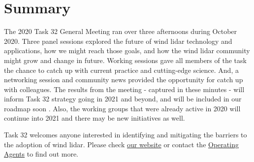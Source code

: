 \section{Summary}
The 2020 Task 32 General Meeting ran over three afternoons during October 2020. Three panel sessions explored the future of wind lidar technology and applications, how we might reach those goals, and how the wind lidar community might grow and change in future. Working sessions gave all members of the task the chance to catch up with current practice and cutting-edge science. And, a networking session and community news provided the opportunity for catch up with colleagues. The results from the meeting - captured in these minutes - will inform Task 32 strategy going in 2021 and beyond, and will be included in our roadmap soon \cite{clifton_2020_roadmap}. Also, the working groups that were already active in 2020 will continue into 2021 and there may be new initiatives as well.

Task 32 welcomes anyone interested in identifying and mitigating the barriers to the adoption of wind lidar. Please check \href{https://community.ieawind.org/task32/}{our website} or contact the \href{mailto:ieawind.task32@ifb.uni-stuttgart.de}{Operating Agents} to find out more.
